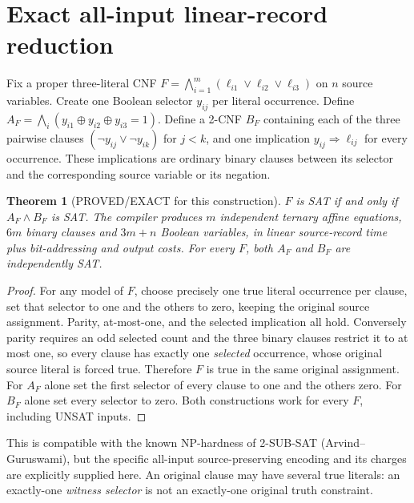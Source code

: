 \documentclass[11pt]{article}
\newtheorem{theorem}{Theorem}
\begin{document}
\section{Exact all-input linear-record reduction}
Fix a proper three-literal CNF $F=\bigwedge_{i=1}^m(\ell_{i1}\vee\ell_{i2}\vee\ell_{i3})$ on $n$ source variables. Create one Boolean selector $y_{ij}$ per literal occurrence. Define $A_F=\bigwedge_i(y_{i1}\oplus y_{i2}\oplus y_{i3}=1)$. Define a 2-CNF $B_F$ containing each of the three pairwise clauses $(\neg y_{ij}\vee\neg y_{ik})$ for $j<k$, and one implication $y_{ij}\Rightarrow \ell_{ij}$ for every occurrence. These implications are ordinary binary clauses between its selector and the corresponding source variable or its negation.
\begin{theorem}[PROVED/EXACT for this construction]
$F$ is SAT if and only if $A_F\wedge B_F$ is SAT. The compiler produces $m$ independent ternary affine equations, $6m$ binary clauses and $3m+n$ Boolean variables, in linear source-record time plus bit-addressing and output costs. For every $F$, both $A_F$ and $B_F$ are independently SAT.
\end{theorem}
\begin{proof}
For any model of $F$, choose precisely one true literal occurrence per clause, set that selector to one and the others to zero, keeping the original source assignment. Parity, at-most-one, and the selected implication all hold. Conversely parity requires an odd selected count and the three binary clauses restrict it to at most one, so every clause has exactly one \emph{selected} occurrence, whose original source literal is forced true. Therefore $F$ is true in the same original assignment. For $A_F$ alone set the first selector of every clause to one and the others zero. For $B_F$ alone set every selector to zero. Both constructions work for every $F$, including UNSAT inputs.
\end{proof}
This is compatible with the known NP-hardness of 2-SUB-SAT (Arvind--Guruswami), but the specific all-input source-preserving encoding and its charges are explicitly supplied here. An original clause may have several true literals: an exactly-one \emph{witness selector} is not an exactly-one original truth constraint.
\end{document}
